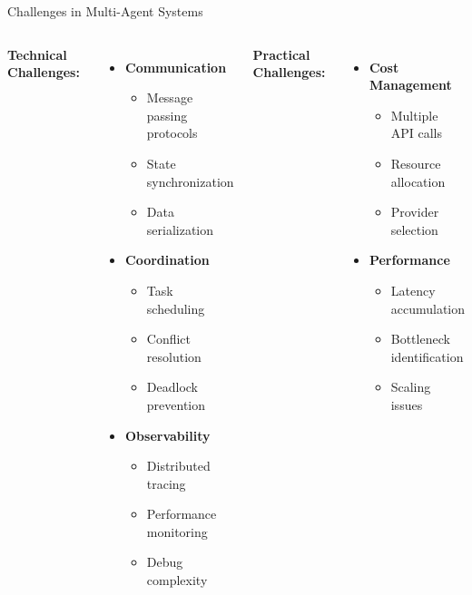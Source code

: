 \documentclass[aspectratio=169,11pt]{beamer}
\begin{document}
\begin{frame}{Challenges in Multi-Agent Systems}

\begin{columns}
\textbf{Technical Challenges:}
\begin{itemize}
    \item {} \textbf{Communication}
    \begin{itemize}
        \item Message passing protocols
        \item State synchronization
        \item Data serialization
    \end{itemize}
    
    \item {} \textbf{Coordination}
    \begin{itemize}
        \item Task scheduling
        \item Conflict resolution
        \item Deadlock prevention
    \end{itemize}
    
    \item {} \textbf{Observability}
    \begin{itemize}
        \item Distributed tracing
        \item Performance monitoring
        \item Debug complexity
    \end{itemize}
\end{itemize}

\textbf{Practical Challenges:}
\begin{itemize}
    \item {} \textbf{Cost Management}
    \begin{itemize}
        \item Multiple API calls
        \item Resource allocation
        \item Provider selection
    \end{itemize}
    
    \item {} \textbf{Performance}
    \begin{itemize}
        \item Latency accumulation
        \item Bottleneck identification
        \item Scaling issues
    \end{itemize}
    

\end{itemize}
\end{columns}
\end{frame}
\end{document}
